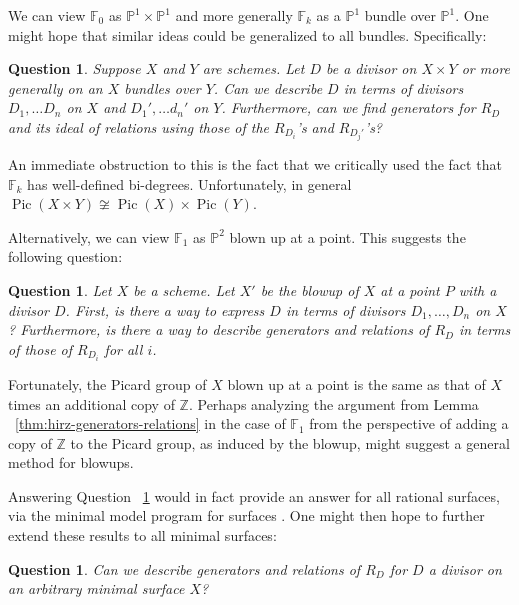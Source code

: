 \documentclass{amsart}
\theoremstyle{plain}
\newtheorem{question}[thm]{Question}
\theoremstyle{definition}
\theoremstyle{remark}
\numberwithin{equation}{section}
\newcommand\bp{{\mathbb P}}
\newcommand\bz{{\mathbb Z}}
\newcommand\hirz{\mathbb{F}}
\DeclareMathOperator{\Pic}{Pic}
\begin{document}
We can view $\hirz_0$ as $\bp^1\times \bp^1$ and more generally $\hirz_k$ as a
$\bp^1$ bundle over $\bp^1$.  One might hope that similar ideas could be
generalized to all bundles.  Specifically:
\begin{question}
\label{qn:general-product-bundle}
Suppose $X$ and $Y$ are schemes.  Let $D$ be a divisor on $X\times Y$ or more
generally on an $X$ bundles over $Y$.  Can we describe $D$ in terms of divisors
$D_1, \ldots D_n$ on $X$ and $D_1', \ldots d_n'$ on $Y$.  Furthermore, can we
find generators for $R_D$ and its ideal of relations using those of the
$R_{D_i}$'s and $R_{D_j'}$'s?
\end{question}

An immediate obstruction to this is the fact that we critically used the fact
that $\hirz_k$ has well-defined bi-degrees.  Unfortunately, in general $\Pic(X
\times Y) \not \cong \Pic(X) \times \Pic(Y)$.

Alternatively, we can view $\hirz_1$ as $\bp^2$ blown up at a point.  This
suggests the following question:
\begin{question}
\label{qn:general-blowup}
Let $X$ be a scheme.  Let $X'$ be the blowup of $X$ at a point $P$ with a
divisor $D$.  First, is there a way to express $D$ in terms of divisors $D_1,
\ldots, D_n$ on $X$?  Furthermore, is there a way to describe generators and
relations of $R_D$ in terms of those of $R_{D_i}$ for all $i$.
\end{question}

Fortunately, the Picard group of $X$ blown up at a point is the same as that of
$X$ times an additional copy of $\bz$.  Perhaps analyzing the argument from
Lemma ~\ref{thm:hirz-generators-relations} in the case of $\hirz_1$ from the
perspective of adding a copy of $\mathbb{Z}$ to the Picard group, as induced by
the blowup, might suggest a general method for blowups.

Answering Question ~\ref{qn:general-blowup} would in fact provide an answer for
all rational surfaces, via the minimal model program for surfaces
.  One might then hope to further extend these results to all minimal surfaces:
\begin{question}
\label{qn:general-minimal-surface}
Can we describe generators and relations of $R_D$ for $D$ a divisor on an
arbitrary minimal surface $X$?
\end{question}

\end{document}
